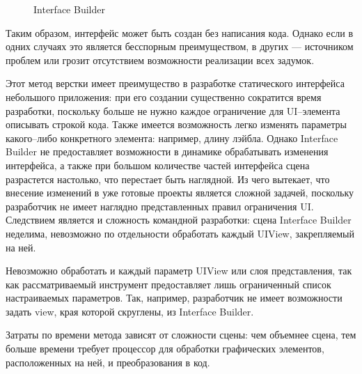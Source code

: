 \begin{figure}[h!]
	\caption{Interface Builder}
	\label{fig:builder}
\end{figure}

Таким образом, интерфейс может быть создан без написания кода. 
Однако если в одних случаях это является бесспорным преимуществом, в других --- источником проблем или грозит отсутствием возможности реализации всех задумок.

Этот метод верстки имеет преимущество в разработке статического интерфейса небольшого приложения: при его создании существенно сократится время разработки, поскольку больше не нужно каждое ограничение для UI--элемента описывать строкой кода. 
Также имеется возможность легко изменять параметры какого--либо конкретного элемента: например, длину лэйбла. 
Однако Interface Builder не предоставляет возможности в динамике обрабатывать изменения интерфейса, а также при большом количестве частей интерфейса сцена разрастется настолько, что перестает быть наглядной. 
Из чего вытекает, что внесение изменений в уже готовые проекты является сложной задачей, поскольку разработчик не имеет наглядно представленных правил ограничения UI. 
Следствием является и сложность командной разработки: сцена Interface Builder неделима, невозможно по отдельности обработать каждый UIView, закрепляемый на ней.

Невозможно обработать и каждый параметр UIView или слоя представления, так как рассматриваемый инструмент предоставляет лишь ограниченный список настраиваемых параметров. 
Так, например, разработчик не имеет возможности задать view, края которой скруглены, из Interface Builder.

Затраты по времени метода зависят от сложности сцены: чем объемнее сцена, тем больше времени требует процессор для обработки графических элементов, расположенных на ней, и преобразования в код. 


